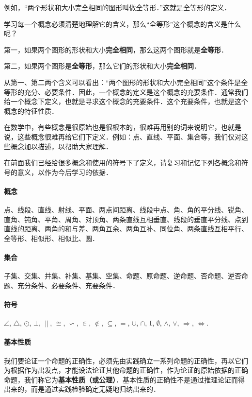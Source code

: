 例如，“两个形状和大小完全相同的图形叫做全等形．”这就是全等形的定义．

学习每一个概念必须清楚地理解它的含义，那么“全等形”这个概念的含义是什么呢？

第一，如果两个图形的形状和大小\textbf{完全相同}，那么这两个图形就是\textbf{全等形}．

第二，如果两个图形是\textbf{全等形}，那么它们的形状和大小\textbf{完全相同}．

从第一、第二两个含义可以看出：“两个图形的形状和大小完全相同”这个条件是全等形的充分、必要条件．因此，一个概念的定义是这个概念的充要条件．通常我们给一个概念下定义，也就是寻求这个概念的充要条件．这个充要条件，也就是这个概念的特征性质．

在数学中，有些概念是很原始也是很根本的，很难再用别的词来说明它，也就是说，这些概念很难再给它们下定义．例如：点、直线、平面、集合等，我们仅对这些概念加以描述，以帮助大家理解．

在前面我们已经给很多概念和使用的符号下了定义，请复习和记忆下列各概念和符号的意义，以作为今后学习的依据．

\paragraph{概念} 点、线段、直线、射线、平面、两点间距离、线段中点、角、角的平分线、锐角、直角、钝角、平角、周角、对顶角、两条直线互相垂直、线段的垂直平分线、点到直线的距离、两角的和与差、两角互余、两角互补、同位角、两条直线互相平行、全等形、相似形、相似比、圆．

\paragraph{集合} 子集、交集、并集、补集、基集、空集、命题、原命题、逆命题、否命题、逆否命题、充分条件、必要条件、充要条件．

\paragraph{符号} $\angle$, $\triangle$, $\odot$, $\bot$, $\parallel$, $\cong$, $\backsim$, $\in$, $\notin$, $\subseteq$, $=$, $\cup$, $\cap$, ${\rm I}$, $\emptyset$, $\wedge$, $\vee$, $\Rightarrow$, $\Leftrightarrow$.

\paragraph{基本性质}

我们要论证一个命题的正确性，必须先由实践确立一系列命题的正确性，再以它们为根据作为出发点，才能设法论证其他命题的正确性，作为论证的原始依据的正确命题，我们称它为\textbf{基本性质（或公理）}．基本性质的正确性不是通过推理论证而得出来的，而是通过实践检验确定无疑地归纳出来的．

